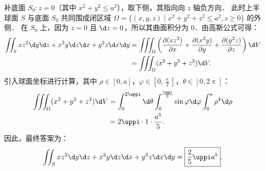 \begin{solution}
    补底面 $S_0: z = 0$（其中 $x^2 + y^2 \le a^2$），取下侧，其指向向 $z$ 轴负方向．
    此时上半球面 $S$ 与底面 $S_0$ 共同围成闭区域 $\Omega = \{ (x, y, z) \mid x^2 + y^2 + z^2 \le a^2, z \ge 0 \}$ 的外侧．
    在 $S_0$ 上，因为 $z = 0$ 且 $\d z = 0$，所以其曲面积分为 $0$．由高斯公式可得：
    \begin{equation}
        \label{eq:ball-half-1}
        \begin{aligned}
            \iint_{S} x z^2 \d y \d z + x^2 y \d z \d x + y^2 z \d x \d y & = \iiint_{\Omega} \left( \frac{\partial(x z^2)}{\partial x} + \frac{\partial(x^2 y)}{\partial y} + \frac{\partial(y^2 z)}{\partial z} \right) \d V \\
                                                                          & = \iiint_{\Omega} (x^2 + y^2 + z^2) \d V.
        \end{aligned}
    \end{equation}
    引入球面坐标进行计算，其中 $\rho \in [0, a]$，$\varphi \in \left[ 0, \frac{\uppi}{2} \right]$，$\theta \in [0, 2\uppi]$：
    \begin{equation}
        \label{eq:ball-half-2}
        \begin{aligned}
            \iiint_{\Omega} (x^2 + y^2 + z^2) \d V & = \int_0^{2\uppi} \d \theta \int_0^{\frac{\uppi}{2}} \sin \varphi \d \varphi \int_0^a \rho^4 \d \rho \\
                                                   & = 2 \uppi \cdot 1 \cdot \frac{a^5}{5}.
        \end{aligned}
    \end{equation}
    因此，最终答案为：
    \begin{equation}
        \label{eq:ball-half-3}
        \iint_{S} x z^2 \d y \d z + x^2 y \d z \d x + y^2 z \d x \d y = \boxed{\frac{2}{5} \uppi a^5}.
    \end{equation}



\end{solution}
